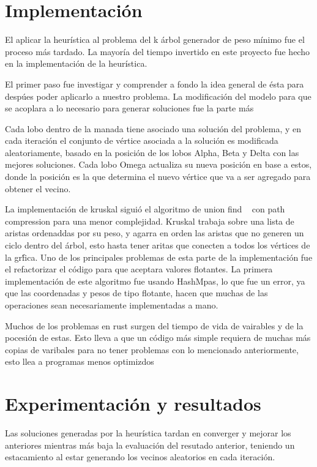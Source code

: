\documentclass[a4paper]{article}
\begin{document}
\section*{Implementaci\'on}
El aplicar la heur\'istica al problema del k \'arbol generador de peso m\'inimo fue el proceso m\'as
tardado. La mayor\'ia del tiempo invertido en este proyecto fue hecho en la implementaci\'on de la
heur\'istica.

El primer paso fue investigar y comprender a fondo la idea general de \'esta para desp\'ues poder
aplicarlo a nuestro problema. La modificaci\'on del modelo para que se acoplara a lo necesario para
generar soluciones fue la parte m\'as 

 Cada lobo dentro de la manada tiene
asociado una soluci\'on del problema, y en cada iteraci\'on el conjunto de v\'ertice asociada a la
soluci\'on es modificada aleatoriamente, basado en la posici\'on de los lobos Alpha, Beta y Delta con las mejores soluciones. Cada lobo Omega actualiza su nueva posici\'on en base a estos, donde la
posici\'on es la que determina el nuevo v\'ertice que va a ser agregado para obtener el vecino.


La implementaci\'on de kruskal sigui\'o el algoritmo de union find ~\cite{unionFind} con path compression para una menor complejidad. Kruskal trabaja sobre una lista de aristas ordenaddas por su peso, y agarra en orden las aristas que no generen un ciclo dentro del \'arbol, esto hasta tener aritas que
conecten a todos los v\'ertices de la gr\'fica. Uno de los principales problemas de esta
parte de la implementaci\'on fue el refactorizar el c\'odigo para que aceptara valores flotantes. La primera implementaci\'on de este algoritmo fue usando HashMpas, lo que fue un error, ya que las
coordenadas y pesos de tipo flotante, hacen que muchas de las operaciones sean necesariamente implementadas a mano. 


Muchos de los problemas en rust surgen del tiempo de vida de vairables y de la pocesi\'on de estas. Esto lleva a que un c\'odigo m\'as simple requiera de muchas m\'as copias de varibales para no tener
problemas con lo mencionado anteriormente, esto llea a programas menos optimizdos 
\section*{Experimentaci\'on y resultados}

Las soluciones generadas por la heur\'istica tardan en converger y mejorar los anteriores mientras
m\'as baja la evaluaci\'on del resutado anterior, teniendo un estacamiento al estar generando los
vecinos aleatorios en cada iteraci\'on.
\end{document}
